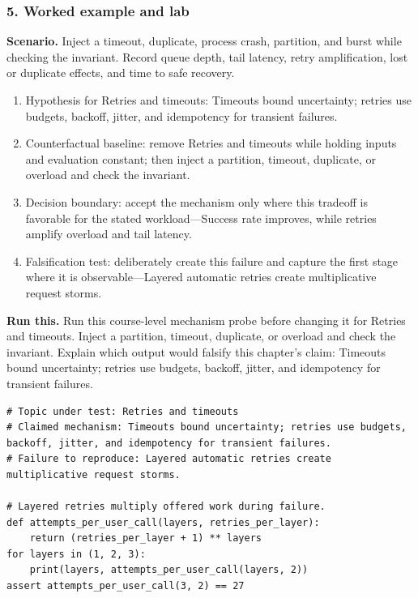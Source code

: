 \subsubsection*{5. Worked example and lab}
\textbf{Scenario.} Inject a timeout, duplicate, process crash, partition, and burst while checking the invariant. Record queue depth, tail latency, retry amplification, lost or duplicate effects, and time to safe recovery.
\begin{enumerate}
\item Hypothesis for Retries and timeouts: Timeouts bound uncertainty; retries use budgets, backoff, jitter, and idempotency for transient failures.
\item Counterfactual baseline: remove Retries and timeouts while holding inputs and evaluation constant; then inject a partition, timeout, duplicate, or overload and check the invariant.
\item Decision boundary: accept the mechanism only where this tradeoff is favorable for the stated workload—Success rate improves, while retries amplify overload and tail latency.
\item Falsification test: deliberately create this failure and capture the first stage where it is observable—Layered automatic retries create multiplicative request storms.
\end{enumerate}
\textbf{Run this.} Run this course-level mechanism probe before changing it for Retries and timeouts. Inject a partition, timeout, duplicate, or overload and check the invariant. Explain which output would falsify this chapter's claim: Timeouts bound uncertainty; retries use budgets, backoff, jitter, and idempotency for transient failures.
\begin{Verbatim}[fontsize=\scriptsize]
# Topic under test: Retries and timeouts
# Claimed mechanism: Timeouts bound uncertainty; retries use budgets, backoff, jitter, and idempotency for transient failures.
# Failure to reproduce: Layered automatic retries create multiplicative request storms.

# Layered retries multiply offered work during failure.
def attempts_per_user_call(layers, retries_per_layer):
    return (retries_per_layer + 1) ** layers
for layers in (1, 2, 3):
    print(layers, attempts_per_user_call(layers, 2))
assert attempts_per_user_call(3, 2) == 27
\end{Verbatim}
